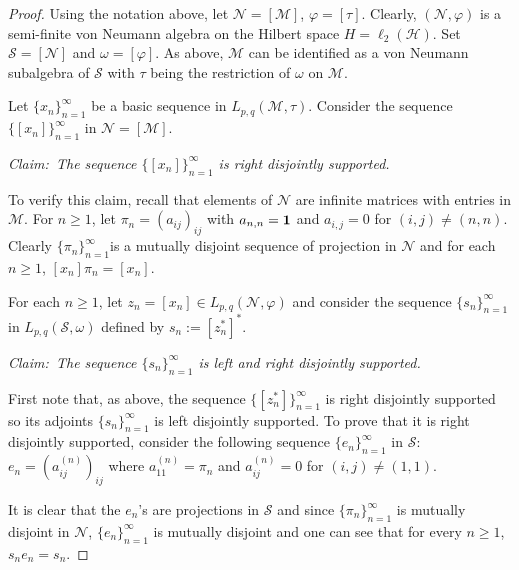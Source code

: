 \documentclass[12pt]{amsart}
\let\cal\mathcal
\def\m{{\cal M}}
\numberwithin{equation}{section}
\numberwithin{theorem}{section}
\begin{document}
\begin{proof}
Using the notation above, let $\cal{N}=[\m]$, $\varphi =[\tau]$.
Clearly, $(\cal N, \varphi)$ is a semi-finite von Neumann algebra on
the Hilbert space $H=\ell_2(\cal H)$. 
Set $\cal{S}=[\cal{N}]$ and $\omega=[\varphi]$. As above, 
$\m$ can be identified as a von Neumann subalgebra of $\cal S$ with 
$\tau$ being the restriction of $\omega$ on $\m$.

Let  $\{x_{n}\}_{n=1}^\infty$  be a basic sequence  in
$L_{p,q}(\m, \tau)$. Consider the sequence $\{[x_n]\}_{n=1}^\infty$
in $\cal{N}=[\m]$.

\noindent
{\it Claim:\ The sequence $\{[x_n]\}_{n=1}^\infty$ is right disjointly
supported.}

To verify this claim, recall that elements of $\cal N$ are infinite
matrices with entries in $\m$. For $n\geq 1$, let
$\pi_n =(a_{ij})_{ij}$ with $a_{n,n}={\bf 1}$ and $a_{i,j}=0$ for
$(i,j)\neq (n,n)$. Clearly $\{\pi_n\}_{n=1}^\infty$is a mutually 
disjoint sequence of projection in $\cal N$ and for each
$n\geq 1$, $[x_n]\pi_n = [x_n]$.

For each $n\geq 1$, let $z_n=[x_n] \in L_{p,q}(\cal{N}, \varphi)$ 
and consider the sequence
$\{s_n \}_{n=1}^\infty$ in $L_{p,q}(\cal S, \omega)$ defined
by $s_n:=[z_{n}^*]^*$.

\noindent
{\it Claim:\ The sequence $\{s_n\}_{n=1}^\infty$ is left and right
disjointly supported.}

First note  that, as  above, the sequence $\{[z_{n}^*]\}_{n=1}^\infty$ 
is right disjointly supported  so its adjoints $\{s_n\}_{n=1}^\infty$
is left disjointly supported. To prove that it is right disjointly supported,
consider the following sequence $\{e_n\}_{n=1}^\infty$ in $\cal S$: 
$e_n=(a_{ij}^{(n)})_{ij}$ where $a_{11}^{(n)}=\pi_n $ and 
$a_{ij}^{(n)}=0$ for $(i,j)\neq (1,1)$.

It is clear that the $e_n$'s are projections in $\cal S$ and since 
$\{\pi_n\}_{n=1}^\infty$ is mutually disjoint in $\cal{N}$,
$\{e_n\}_{n=1}^\infty$ is mutually disjoint and one can see that for every
$n\geq 1$, $s_ne_n=s_n$.


\end{proof}
\end{document}
